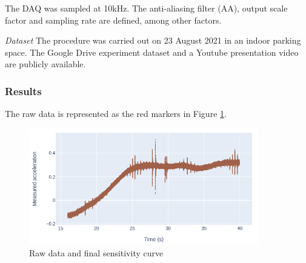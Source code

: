 The DAQ was sampled at 10kHz. The anti-aliasing filter (AA), output scale factor and sampling rate are defined, among other factors.


\textit{Dataset} \hspace{0.3cm} The procedure was carried out on 23 August 2021 in an indoor parking space. The Google Drive experiment dataset \cite{vibrationmount_dataset} and a Youtube presentation video \cite{vibrationmount_video} are publicly available.

\subsubsection{Results}

The raw data is represented as the red markers in Figure \ref{fig:raw_footsteps}. 



    
\begin{figure}[!h]
    \raggedright
    \includegraphics[width=10cm]{images/stage_graphs/vibration_results/raw_footsteps.png}
    \caption{Raw data and final sensitivity curve}
    \label{fig:raw_footsteps}
\end{figure}


